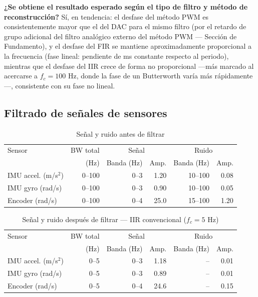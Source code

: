 \textbf{¿Se obtiene el resultado esperado según el tipo de filtro y método de reconstrucción?} Sí, en tendencia: el desfase del método PWM es consistentemente mayor que el del DAC para el mismo filtro (por el retardo de grupo adicional del filtro analógico externo del método PWM — Sección de Fundamento), y el desfase del FIR se mantiene aproximadamente proporcional a la frecuencia (fase lineal: pendiente de ms constante respecto al periodo), mientras que el desfase del IIR crece de forma no proporcional —más marcado al acercarse a $f_c = 100$ Hz, donde la fase de un Butterworth varía más rápidamente—, consistente con su fase no lineal.

\subsection{Filtrado de señales de sensores}

\begin{table}[!t]
\centering
\caption{Señal y ruido antes de filtrar}
\label{tab:sensores-antes}
\small
\begin{tabular}{@{}l r r r r r@{}}
\toprule
Sensor & BW total & \multicolumn{2}{c}{Señal} & \multicolumn{2}{c}{Ruido} \\
 & (Hz) & Banda (Hz) & Amp. & Banda (Hz) & Amp. \\
\midrule
IMU accel. (m/s$^2$) & 0--100 & 0--3 & 1.20 & 10--100 & 0.08 \\
IMU gyro (rad/s)     & 0--100 & 0--3 & 0.90 & 10--100 & 0.05 \\
Encoder (rad/s)      & 0--100 & 0--4 & 25.0 & 15--100 & 1.20 \\
\bottomrule
\end{tabular}
\end{table}

\begin{table}[!t]
\centering
\caption{Señal y ruido después de filtrar — IIR convencional ($f_c=5$ Hz)}
\label{tab:sensores-iir}
\small
\begin{tabular}{@{}l r r r r r@{}}
\toprule
Sensor & BW total & \multicolumn{2}{c}{Señal} & \multicolumn{2}{c}{Ruido} \\
 & (Hz) & Banda (Hz) & Amp. & Banda (Hz) & Amp. \\
\midrule
IMU accel. (m/s$^2$) & 0--5 & 0--3 & 1.18 & -- & 0.01 \\
IMU gyro (rad/s)     & 0--5 & 0--3 & 0.89 & -- & 0.01 \\
Encoder (rad/s)      & 0--5 & 0--4 & 24.6 & -- & 0.15 \\
\bottomrule
\end{tabular}
\end{table}

